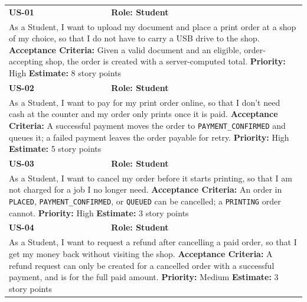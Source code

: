 \documentclass[12pt,a4paper]{report}
\begin{document}
\begin{center}
\renewcommand{\arraystretch}{1.3}
\begin{longtable}{|p{1.6cm}|p{11.7cm}|}
\hline
\textbf{US-01} & \textbf{Role: Student} \\
\multicolumn{2}{|p{13.3cm}|}{As a Student, I want to upload my document and place a print order at a shop of my choice, so that I do not have to carry a USB drive to the shop. \newline \textbf{Acceptance Criteria:} Given a valid document and an eligible, order-accepting shop, the order is created with a server-computed total. \newline \textbf{Priority:} High \quad \textbf{Estimate:} 8 story points} \\ \hline

\textbf{US-02} & \textbf{Role: Student} \\
\multicolumn{2}{|p{13.3cm}|}{As a Student, I want to pay for my print order online, so that I don't need cash at the counter and my order only prints once it is paid. \newline \textbf{Acceptance Criteria:} A successful payment moves the order to \texttt{PAYMENT\_CONFIRMED} and queues it; a failed payment leaves the order payable for retry. \newline \textbf{Priority:} High \quad \textbf{Estimate:} 5 story points} \\ \hline

\textbf{US-03} & \textbf{Role: Student} \\
\multicolumn{2}{|p{13.3cm}|}{As a Student, I want to cancel my order before it starts printing, so that I am not charged for a job I no longer need. \newline \textbf{Acceptance Criteria:} An order in \texttt{PLACED}, \texttt{PAYMENT\_CONFIRMED}, or \texttt{QUEUED} can be cancelled; a \texttt{PRINTING} order cannot. \newline \textbf{Priority:} High \quad \textbf{Estimate:} 3 story points} \\ \hline

\textbf{US-04} & \textbf{Role: Student} \\
\multicolumn{2}{|p{13.3cm}|}{As a Student, I want to request a refund after cancelling a paid order, so that I get my money back without visiting the shop. \newline \textbf{Acceptance Criteria:} A refund request can only be created for a cancelled order with a successful payment, and is for the full paid amount. \newline \textbf{Priority:} Medium \quad \textbf{Estimate:} 3 story points} \\ \hline


\end{longtable}
\end{center}
\end{document}
